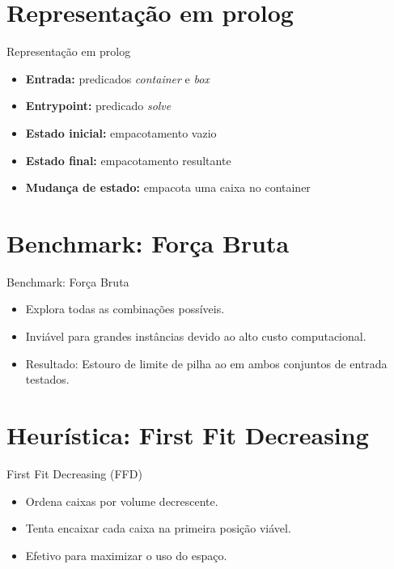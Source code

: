 \documentclass{beamer}
\begin{document}
\section{Representação em prolog}
\begin{frame}{Representação em prolog}

	\begin{itemize}
		\item \textbf{Entrada:} predicados \emph{container} e \emph{box}
		\item \textbf{Entrypoint:} predicado \emph{solve}
		\item \textbf{Estado inicial:} empacotamento vazio
		\item \textbf{Estado final:} empacotamento resultante
		\item \textbf{Mudança de estado:} empacota uma caixa no container
	\end{itemize}
\end{frame}

\section{Benchmark: Força Bruta}
\begin{frame}{Benchmark: Força Bruta}
	\begin{itemize}
		\item Explora todas as combinações possíveis.
		\item Inviável para grandes instâncias devido ao alto custo computacional.
		\item Resultado: Estouro de limite de pilha ao em ambos conjuntos de entrada testados.
	\end{itemize}
\end{frame}

\section{Heurística: First Fit Decreasing}
\begin{frame}{First Fit Decreasing (FFD)}
	\begin{itemize}
		\item Ordena caixas por volume decrescente.
		\item Tenta encaixar cada caixa na primeira posição viável.
		\item Efetivo para maximizar o uso do espaço.
	\end{itemize}
\end{frame}
\end{document}
